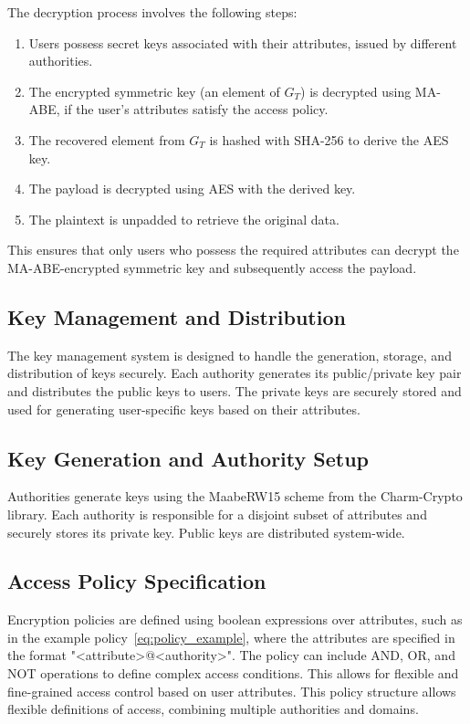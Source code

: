 \documentclass[cic,tc,english]{iiufrgs}
\begin{document}
            The decryption process involves the following steps:
            \begin{enumerate}
                \item Users possess secret keys associated with their attributes, issued by different authorities.
                \item The encrypted symmetric key (an element of $G_T$) is decrypted using MA-ABE, if the user's attributes satisfy the access policy.
                \item The recovered element from $G_T$ is hashed with SHA-256 to derive the AES key.
                \item The payload is decrypted using AES with the derived key.
                \item The plaintext is unpadded to retrieve the original data.
            \end{enumerate}

            This ensures that only users who possess the required attributes can decrypt the MA-ABE-encrypted symmetric key and subsequently access the payload.


        \subsection{Key Management and Distribution}
            The key management system is designed to handle the generation, storage, and distribution of keys securely. Each authority generates its public/private key pair and distributes the public keys to users. The private keys are securely stored and used for generating user-specific keys based on their attributes.

        \subsection{Key Generation and Authority Setup}
            Authorities generate keys using the MaabeRW15 scheme from the Charm-Crypto library. Each authority is responsible for a disjoint subset of attributes and securely stores its private key. Public keys are distributed system-wide.

        \subsection{Access Policy Specification}
            Encryption policies are defined using boolean expressions over attributes, such as in the example policy~\ref{eq:policy_example}, where the attributes are specified in the format "<attribute>@<authority>". The policy can include AND, OR, and NOT operations to define complex access conditions. This allows for flexible and fine-grained access control based on user attributes.
            This policy structure allows flexible definitions of access, combining multiple authorities and domains.
\end{document}
